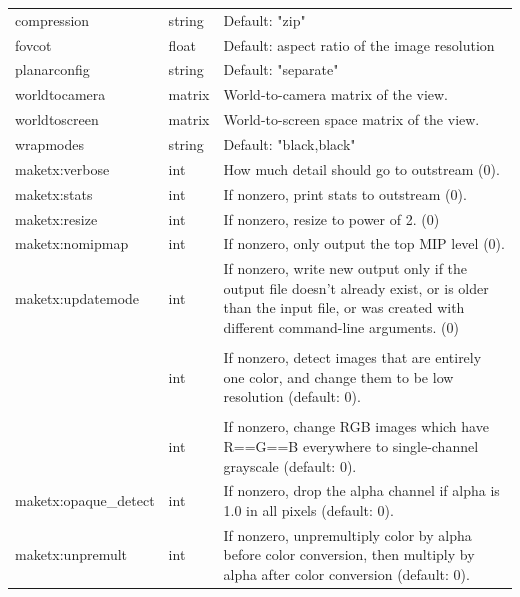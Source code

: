 \begin{longtable}{ >{\spc \cf\small}p{1.8in} >{\cf\small}l p{3in}}
   compression & string &   Default: "zip" \\
   fovcot & float &          Default: aspect ratio of the image resolution \\
   planarconfig & string &  Default: "separate" \\
   worldtocamera & matrix &  World-to-camera matrix of the view. \\
   worldtoscreen & matrix &  World-to-screen space matrix of the view. \\
   wrapmodes & string &     Default: "black,black" \\
   maketx:verbose & int &    How much detail should go to outstream (0). \\
   maketx:stats & int &      If nonzero, print stats to outstream (0). \\
   maketx:resize & int &     If nonzero, resize to power of 2. (0) \\
   maketx:nomipmap & int &   If nonzero, only output the top MIP level (0). \\
   maketx:updatemode & int &  If nonzero, write new output only if the
                             output file doesn't already exist, or is
                             older than the input file, or was created with
                             different command-line arguments. (0) \\
   \multicolumn{2}{l}{\spc \cf\small maketx:constant_color_detect} \\  & int &
                          If nonzero, detect images that are entirely
                            one color, and change them to be low
                            resolution (default: 0). \\
   \multicolumn{2}{l}{\spc \cf\small maketx:monochrome_detect} \\ & int &
                          If nonzero, change RGB images which have
                             R==G==B everywhere to single-channel
                             grayscale (default: 0). \\
   maketx:opaque_detect & int &
                          If nonzero, drop the alpha channel if alpha
                             is 1.0 in all pixels (default: 0). \\
   maketx:unpremult & int &  If nonzero, unpremultiply color by alpha before
                             color conversion, then multiply by alpha
                             after color conversion (default: 0). \\

\end{longtable}
